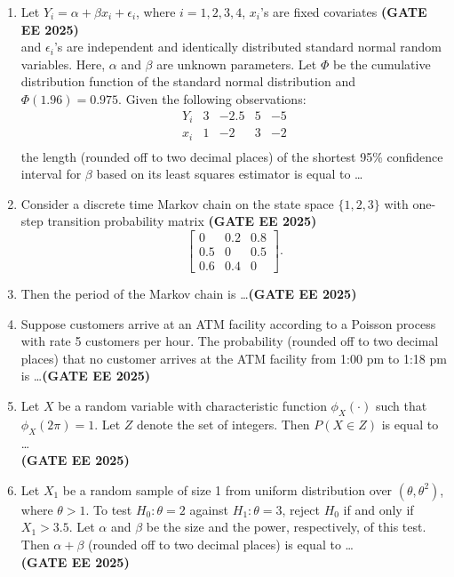 \documentclass[journal,12pt,onecolumn]{IEEEtran}
\theoremstyle{remark}
\begin{document}
\begin{enumerate}
\item Let $Y_i = \alpha + \beta x_i + \epsilon_i$, where $i = 1,2,3,4$, $x_i$'s are fixed covariates \hfill \textbf{(GATE EE 2025)}\\
and $\epsilon_i$'s are independent and identically distributed standard normal random variables. 
Here, $\alpha$ and $\beta$ are unknown parameters. Let $\Phi$ be the cumulative distribution function 
of the standard normal distribution and $\Phi(1.96) = 0.975$. Given the following observations:
\[
\begin{array}{c|cccc}
Y_i & 3 & -2.5 & 5 & -5 \\
x_i & 1 & -2 & 3 & -2 \\
\end{array}
\]
the length (rounded off to two decimal places) of the shortest 95\% confidence interval for $\beta$ 
based on its least squares estimator is equal to \dots



\item Consider a discrete time Markov chain on the state space $\{1,2,3\}$ with one-step transition probability matrix \hfill \textbf{(GATE EE 2025)}\\
\[
\begin{bmatrix}
0 & 0.2 & 0.8 \\
0.5 & 0 & 0.5 \\
0.6 & 0.4 & 0
\end{bmatrix}.
\]
\item Then the period of the Markov chain is \dots \hfill \textbf{(GATE EE 2025)}\\

\item Suppose customers arrive at an ATM facility according to a Poisson process with rate 5 customers per hour. 
The probability (rounded off to two decimal places) that no customer arrives at the ATM facility 
from 1:00 pm to 1:18 pm is \dots \hfill \textbf{(GATE EE 2025)}\\

\item Let $X$ be a random variable with characteristic function $\phi_X(\cdot)$ such that $\phi_X(2\pi) = 1$. Let ${Z}$ denote the set of integers. Then $P(X \in {Z})$ is equal to \ldots \\[1em] \hfill \textbf{(GATE EE 2025)}\\

\item Let $X_1$ be a random sample of size 1 from uniform distribution over $(\theta, \theta^2)$, where $\theta > 1$. To test $H_0: \theta = 2$ against $H_1: \theta = 3$, reject $H_0$ if and only if $X_1 > 3.5$. Let $\alpha$ and $\beta$ be the size and the power, respectively, of this test. Then $\alpha + \beta$ (rounded off to two decimal places) is equal to \ldots \\[1em] \hfill \textbf{(GATE EE 2025)}\\


\end{enumerate}
\end{document}
